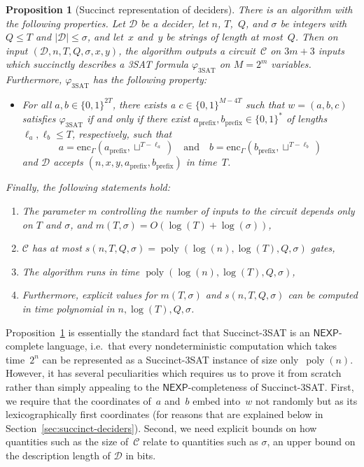 \documentclass[11pt]{article}
\newtheorem{proposition}[theorem]{Proposition}
\theoremstyle{definition}
\DeclareMathOperator{\poly}{poly}
\newcommand{\decider}{\mathcal{D}}
\newcommand{\circuit}{\mathcal{C}}
\newcommand{\qlen}{Q}
\begin{document}
\begin{proposition}[Succinct representation of deciders]
  \label{prop:standard-succinct-sat}
  There is an algorithm with the following properties.
  Let $\decider$ be a decider, let $n$, $T$,~$\qlen$, and $\sigma$ be integers
  with $\qlen \leq T$ and $|\decider| \leq \sigma$, and let~$x$ and~$y$ be
  strings of length at most~$\qlen$.
  Then on input $(\decider, n, T, \qlen, \sigma, x, y)$, the algorithm outputs
  a circuit~$\circuit$ on $3m + 3$ inputs which succinctly describes a 3SAT
  formula $\varphi_{\mathrm{3SAT}}$ on $M = 2^m$ variables.
  Furthermore, $\varphi_{\mathrm{3SAT}}$ has the following property:
  \begin{itemize}
  \item For all $a, b \in \{0, 1\}^{2T}$, there exists a $c \in \{0, 1\}^{M-4T}$
    such that $w = (a, b, c)$ satisfies $\varphi_{\mathrm{3SAT}}$ if and only if
    there exist $a_{\mathrm{prefix}}, b_{\mathrm{prefix}} \in \{0, 1\}^*$ of
    lengths~$\ell_a, \ell_b \leq T$, respectively, such that
    \begin{equation*}
      a = \mathrm{enc}_\Gamma(a_{\mathrm{prefix}}, \sqcup^{T - \ell_a})
      \quad
      \text{and}
      \quad
      b = \mathrm{enc}_\Gamma(b_{\mathrm{prefix}}, \sqcup^{T - \ell_b})
    \end{equation*}
    and $\decider$ accepts $(n, x, y, a_{\mathrm{prefix}}, b_{\mathrm{prefix}})$
    in time~$T$.
  \end{itemize}
  Finally, the following statements hold:
  \begin{enumerate}
  \item The parameter $m$ controlling the number of inputs to the circuit
    depends only on $T$ and $\sigma$, and $m(T,\sigma) = O(\log(T) +
    \log(\sigma))$,
  \item $\circuit$ has at most $s(n,T,\qlen,\sigma)=\poly(\log(n), \log(T),
    \qlen, \sigma)$ gates,
  \item The algorithm runs in time $\poly(\log(n), \log(T), \qlen,\sigma)$,
  \item Furthermore, explicit values for $m(T, \sigma)$ and
    $s(n, T, \qlen, \sigma)$ can be computed in time polynomial in
    $n,\log(T),\qlen,\sigma$.
  \end{enumerate}
\end{proposition}

Proposition~\ref{prop:standard-succinct-sat} is essentially the standard fact
that Succinct-3SAT is an $\mathsf{NEXP}$-complete language, i.e.\ that every
nondeterministic computation which takes time~$2^n$ can be represented as a
Succinct-3SAT instance of size only~$\poly(n)$.
However, it has several peculiarities which requires us to prove it from scratch
rather than simply appealing to the $\mathsf{NEXP}$-completeness of
Succinct-3SAT.
First, we require that the coordinates of~$a$ and~$b$ embed into~$w$ not
randomly but as its lexicographically first coordinates (for reasons that are
explained below in Section~\ref{sec:succinct-deciders}).
Second, we need explicit bounds on how quantities such as the size of~$\circuit$
relate to quantities such as $\sigma$, an upper bound on the description length
of $\decider$ in bits.
\end{document}
